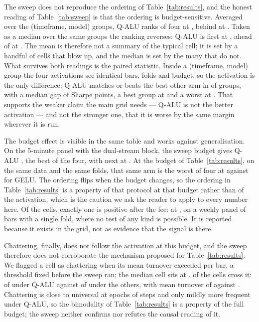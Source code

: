 \documentclass[conference]{IEEEtran}
\begin{document}
The sweep does not reproduce the ordering of Table~\ref{tab:results}, and the
honest reading of Table~\ref{tab:sweep} is that the ordering is budget-sensitive.
Averaged over the \sweepGroups{} (timeframe, model) groups, Q-ALU ranks
\sweepQaluRank{} of four at \sweepQaluMean{}, behind \sweepBestAct{} at
\sweepBestActMean{}. Taken as a median over the same groups the ranking reverses:
Q-ALU is first at \sweepMedQalu{}, ahead of \sweepMedNextAct{} at
\sweepMedNext{}. The mean is
therefore not a summary of the typical cell; it is set by a handful of cells that
blow up, and the median is set by the many that do not. What survives both
readings is the paired statistic. Inside a (timeframe, model) group the four
activations see identical bars, folds and budget, so the activation is the only
difference; Q-ALU matches or beats the best other arm in \sweepQaluWins{} of
\sweepGroups{} groups, with a median gap of \sweepQaluGapMed{} Sharpe points, a
best group at \sweepQaluGapBest{} and a worst at \sweepQaluGapWorst{}. That
supports the weaker claim the main grid needs --- Q-ALU is not the better
activation --- and not the stronger one, that it is worse by the same margin
wherever it is run.

The budget effect is visible in the same table and works against generalisation.
On the 5-minute panel with the dual-stream block, the sweep budget gives Q-ALU
\sweepFiveMQalu{}, the best of the four, with \sweepFiveMNextAct{} next at
\sweepFiveMNext{}. At the budget of Table~\ref{tab:results}, on the same data and
the same folds, that same arm is the worst of four at \srQalu{} against \srGelu{}
for GELU. The ordering flips when the budget changes, so the ordering in
Table~\ref{tab:results} is a property of that protocol at that budget rather than
of the activation, which is the caution we ask the reader to apply to every
number here. Of the \sweepCells{} cells, exactly one is positive after the fee:
\sweepBestCell{} at \sweepBestSharpe{}, on a weekly panel of \sweepBarsOneW{} bars
with a single fold, where no test of any kind is possible. It is reported because
it exists in the grid, not as evidence that the signal is there.

Chattering, finally, does not follow the activation at this budget, and the sweep
therefore does not corroborate the mechanism proposed for Table~\ref{tab:results}.
We flagged a cell as chattering when its mean turnover exceeded \sweepChatThr{}
per bar, a threshold fixed before the sweep ran; the median cell sits at
\sweepTurnMedian{}. \sweepChatCells{} of the \sweepChatDenom{} cells cross it:
\sweepChatQalu{} of \sweepQaluCells{} under Q-ALU against \sweepChatOther{} of
\sweepOtherCells{} under the others, with mean turnover of \sweepTurnQalu{}
against \sweepTurnOther{}. Chattering is close to universal at \sweepEpochs{}
epochs of \sweepSteps{} steps and only mildly more frequent under Q-ALU, so the
bimodality of Table~\ref{tab:results} is a property of the full budget; the sweep
neither confirms nor refutes the causal reading of it.
\end{document}
